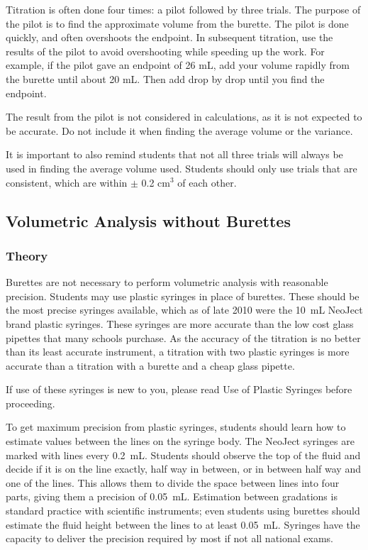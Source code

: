 Titration is often done four times: a pilot followed by three trials. The purpose of the pilot is to find the approximate volume from the burette. The pilot is done quickly, and often overshoots the endpoint. In subsequent titration, use the results of the pilot to avoid overshooting while speeding up the work. For example, if the pilot gave an endpoint of 26 mL, add your volume rapidly from the burette until about 20 mL. Then add drop by drop until you find the endpoint.

The result from the pilot is not considered in calculations, as it is not expected to be accurate. Do not include it when finding the average volume or the variance.

It is important to also remind students that not all three trials will always be used in finding the average volume used. Students should only use trials that are consistent, which are within $\pm$ 0.2 cm$^3$ of each other.


\subsection{Volumetric Analysis without Burettes}

\subsubsection{Theory}

Burettes are not necessary to perform volumetric analysis with reasonable precision. Students may use plastic syringes in place of burettes. These should be the most precise syringes available, which as of late 2010 were the 10~mL NeoJect brand plastic syringes. These syringes are more accurate than the low cost glass pipettes that many schools purchase. As the accuracy of the titration is no better than its least accurate instrument, a titration with two plastic syringes is more accurate than a titration with a burette and a cheap glass pipette.

If use of these syringes is new to you, please read Use of Plastic Syringes before proceeding.

To get maximum precision from plastic syringes, students should learn how to estimate values between the lines on the syringe body. The NeoJect syringes are marked with lines every 0.2~mL. Students should observe the top of the fluid and decide if it is on the line exactly, half way in between, or in between half way and one of the lines. This allows them to divide the space between lines into four parts, giving them a precision of 0.05~mL. Estimation between gradations is standard practice with scientific instruments; even students using burettes should estimate the fluid height between the lines to at least 0.05~mL. Syringes have the capacity to deliver the precision required by most if not all  national exams.

